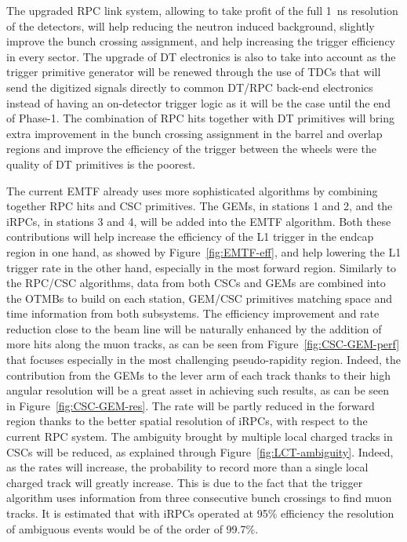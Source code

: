 	The upgraded RPC link system, allowing to take profit of the full \SI{1}{ns} resolution of the detectors, will help reducing the neutron induced background, slightly improve the bunch crossing assignment, and help increasing the trigger efficiency in every sector. The upgrade of DT electronics is also to take into account as the trigger primitive generator will be renewed through the use of TDCs that will send the digitized signals directly to common DT/RPC back-end electronics instead of having an on-detector trigger logic as it will be the case until the end of Phase-1. The combination of RPC hits together with DT primitives will bring extra improvement in the bunch crossing assignment in the barrel and overlap regions and improve the efficiency of the trigger between the wheels were the quality of DT primitives is the poorest.

	The current EMTF already uses more sophisticated algorithms by combining together RPC hits and CSC primitives. The GEMs, in stations 1 and 2, and the iRPCs, in stations 3 and 4, will be added into the EMTF algorithm. Both these contributions will help increase the efficiency of the L1 trigger in the endcap region in one hand, as showed by Figure~\ref{fig:EMTF-eff}, and help lowering the L1 trigger rate in the other hand, especially in the most forward region. Similarly to the RPC/CSC algorithms, data from both CSCs and GEMs are combined into the \acf{OTMBs} to build on each station, GEM/CSC primitives matching space and time information from both subsystems. The efficiency improvement and rate reduction close to the beam line will be naturally enhanced by the addition of more hits along the muon tracks, as can be seen from Figure~\ref{fig:CSC-GEM-perf} that focuses especially in the most challenging pseudo-rapidity region. Indeed, the contribution from the GEMs to the lever arm of each track thanks to their high angular resolution will be a great asset in achieving such results, as can be seen in Figure~\ref{fig:CSC-GEM-res}. The rate will be partly reduced in the forward region thanks to the better spatial resolution of iRPCs, with respect to the current RPC system. The ambiguity brought by multiple local charged tracks in CSCs will be reduced, as explained through Figure~\ref{fig:LCT-ambiguity}. Indeed, as the rates will increase, the probability to record more than a single local charged track will greatly increase. This is due to the fact that the trigger algorithm uses information from three consecutive bunch crossings to find muon tracks. It is estimated that with iRPCs operated at 95\% efficiency the resolution of ambiguous events would be of the order of 99.7\%.

